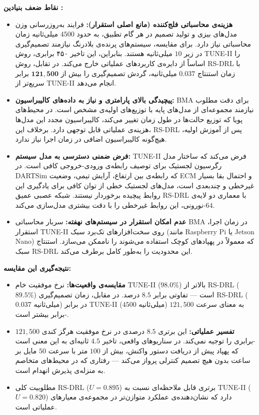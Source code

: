 \documentclass[oneside,openany,a4paper,12pt]{article}
\begin{document}
\textbf{نقاط ضعف بنیادین :}
\begin{itemize}
    \item \textbf{هزینه‌ی محاسباتی فلج‌کننده (مانع اصلی استقرار):} فرایند به‌روزرسانی وزن مدل‌های بیزی و تولید تصمیم در هر گام تطبیق، به حدود $4500$ میلی‌ثانیه زمان محاسباتی نیاز دارد. برای مقایسه، سیستم‌های پرنده‌ی بلادرنگ نیازمند تصمیم‌گیری در زیر $10$ میلی‌ثانیه هستند. بنابراین، این تاخیر ۴۵۰ برابری، روش TUNE-II را اساساً از دایره‌ی کاربردهای عملیاتی خارج می‌کند. در تقابل، روش RS-DRL با زمان استنتاج $0.037$ میلی‌ثانیه، گردش تصمیم‌گیری را بیش از $\mathbf{121{,}500}$ برابر سریع‌تر از TUNE-II انجام می‌دهد.
    \item \textbf{پیچیدگی بالای پارامتری و نیاز به داده‌های کالیبراسیون:} BMA برای دقت مطلوب نیازمند مجموعه‌ای از مدل‌های پایه با توزیع‌های اولیه‌ی مشخص است. در محیط‌های پویا که توزیع حالت‌ها در طول زمان تغییر می‌کند، کالیبراسیون مجدد این مدل‌ها هزینه‌ی عملیاتی قابل توجهی دارد. برخلاف این، RS-DRL پس از آموزش اولیه، هیچ‌گونه کالیبراسیون اضافی در زمان اجرا نیاز ندارد.
    \item \textbf{فرض ضمنی دسترسی به مدل سیستم:} TUNE-II فرض می‌کند که ساختار مدل رگرسیون لجستیک برای توصیف رابطه‌ی ورودی-خروجی کافی است. در DARTSim که رابطه‌ی بین ارتفاع، آرایش تیمی، وضعیت ECM و احتمال بقا بسیار غیرخطی و چندبعدی است، مدل‌های لجستیک خطی از توان کافی برای یادگیری این روابط پیچیده برخوردار نیستند. شبکه عصبی عمیق RS-DRL با معماری  دو لایه‌ی $64$-نورونی، این روابط غیرخطی را با دقت بیشتری مدل‌سازی می‌کند.
    \item \textbf{عدم امکان استقرار در سیستم‌های نهفته:} سربار محاسباتی BMA در زمان اجرا، استقرار TUNE-II روی سخت‌افزارهای تک‌برد سبک (مانند Raspberry Pi یا Jetson Nano) که معمولاً در پهپادهای کوچک استفاده می‌شوند را ناممکن می‌سازد. استنتاج سبک RS-DRL این محدودیت را به‌طور کامل برطرف می‌کند.
\end{itemize}

\textbf{نتیجه‌گیری این مقایسه:}
\begin{itemize}
    \item \textbf{مقایسه‌ی واقعیت‌ها:} نرخ موفقیت خام TUNE-II ($98.0\%$) بالاتر از RS-DRL ($89.5\%$) است — تفاوتی برابر $8.5$ درصد. در مقابل، زمان تصمیم‌گیری RS-DRL ($0.037$ میلی‌ثانیه) در برابر TUNE-II ($4500$ میلی‌ثانیه) به معنای سرعت $121{,}500$-برابر بیشتر است.
    \item \textbf{تفسیر عملیاتی:} این برتری $8.5$ درصدی در نرخ موفقیت هرگز کندی $121{,}500$-برابری را توجیه نمی‌کند. در سناریوهای واقعی، تاخیر $4.5$ ثانیه‌ای به این معنی است که پهپاد پیش از دریافت دستور واکنش، بیش از $100$ متر با سرعت $50$ مایل بر ساعت بدون هیچ تصمیم کنترلی پرواز می‌کند — رفتاری که در محیط‌های متخاصم به منزله‌ی پذیرش انهدام است.
    \item مطلوبیت کلی RS-DRL ($U=0.895$) برتری قابل ملاحظه‌ای نسبت به TUNE-II ($U=0.820$) دارد که نشان‌دهنده‌ی عملکرد متوازن‌تر در مجموعه‌ی معیارهای عملیاتی است.
\end{itemize}
\end{document}
